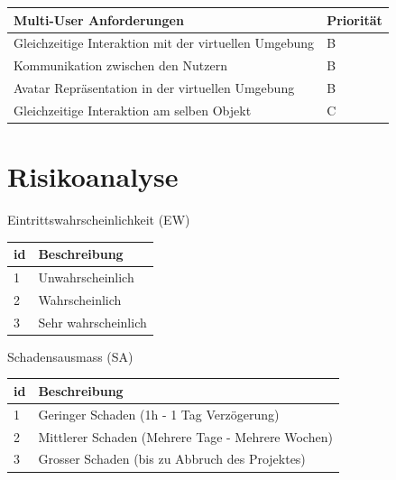 \begin{center}
	\begin{tabular}	{ |l|l| }
		\hline
		\rowcolor{black}
		\color{white} \textbf{Multi-User Anforderungen} & \color{white} \textbf{Priorität} \\
		\hline
		Gleichzeitige Interaktion mit der virtuellen Umgebung & B \\
		\hline
		Kommunikation zwischen den Nutzern & B \\
		\hline
		Avatar Repräsentation in der virtuellen Umgebung & B \\
		\hline		
		Gleichzeitige Interaktion am selben Objekt & C \\
		\hline
	\end{tabular}
\end{center}
\label{tbl:multi_user_anforderungen}

\section{Risikoanalyse}
Eintrittswahrscheinlichkeit (EW)
\begin{center}
	\begin{tabular}	{ |l|l| }
		\hline
		\rowcolor{black}
		\color{white} \textbf{id} & \color{white} \textbf{Beschreibung} \\
		\hline
		1 & Unwahrscheinlich \\
		\hline
		2 & Wahrscheinlich \\
		\hline
		3 & Sehr wahrscheinlich \\
		\hline
	\end{tabular}
\end{center}
\label{tbl:eintrittswahrscheinlichkeit}

\bigskip
Schadensausmass (SA)
\begin{center}
	\begin{tabular}	{ |l|l| }
		\hline
		\rowcolor{black}
		\color{white} \textbf{id} & \color{white} \textbf{Beschreibung} \\
		\hline
		1 & Geringer Schaden (1h - 1 Tag Verzögerung) \\
		\hline
		2 & Mittlerer Schaden (Mehrere Tage - Mehrere Wochen) \\
		\hline
		3 & Grosser Schaden (bis zu Abbruch des Projektes) \\
		\hline
	\end{tabular}
\end{center}
\label{tbl:schadensausmass}


